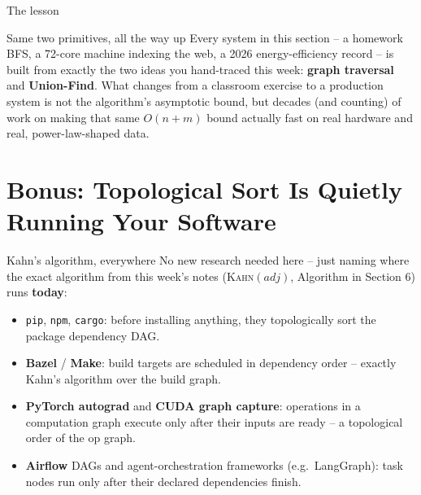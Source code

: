 \documentclass[11pt,aspectratio=169]{beamer}
\begin{document}
\begin{frame}{The lesson}
  \begin{alertblock}{Same two primitives, all the way up}
    Every system in this section -- a homework BFS, a 72-core machine indexing the
    web, a 2026 energy-efficiency record -- is built from exactly the two ideas you
    hand-traced this week: \textbf{graph traversal} and \textbf{Union-Find}. What
    changes from a classroom exercise to a production system is not the algorithm's
    asymptotic bound, but decades (and counting) of work on making that same $O(n+m)$
    bound actually fast on real hardware and real, power-law-shaped data.
  \end{alertblock}
\end{frame}

\section{Bonus: Topological Sort Is Quietly Running Your Software}

\begin{frame}{Kahn's algorithm, everywhere}
  No new research needed here -- just naming where the exact algorithm from this
  week's notes (\textsc{Kahn}$(adj)$, Algorithm in Section 6) runs \textbf{today}:
  \begin{itemize}
    \item \texttt{pip}, \texttt{npm}, \texttt{cargo}: before installing anything, they
    topologically sort the package dependency DAG.
    \item \textbf{Bazel} / \textbf{Make}: build targets are scheduled in dependency
    order -- exactly Kahn's algorithm over the build graph.
    \item \textbf{PyTorch autograd} and \textbf{CUDA graph capture}: operations in a
    computation graph execute only after their inputs are ready -- a topological order
    of the op graph.
    \item \textbf{Airflow} DAGs and agent-orchestration frameworks (e.g.\ LangGraph):
    task nodes run only after their declared dependencies finish.
  \end{itemize}
\end{frame}
\end{document}
